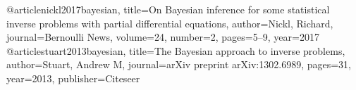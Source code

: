 @article{nickl2017bayesian,
	title={On Bayesian inference for some statistical inverse problems with partial differential equations},
	author={Nickl, Richard},
	journal={Bernoulli News},
	volume={24},
	number={2},
	pages={5--9},
	year={2017}
}
@article{stuart2013bayesian,
  title={The Bayesian approach to inverse problems},
  author={Stuart, Andrew M},
  journal={arXiv preprint arXiv:1302.6989},
  pages={31},
  year={2013},
  publisher={Citeseer}
}

